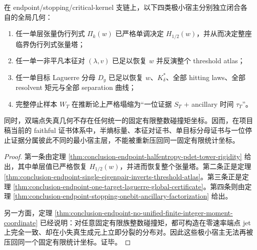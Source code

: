 \begin{theorem}\label{thm:conclusion-endpoint-four-minimal-hosts-noncompressible}
在 endpoint/stopping/critical-kernel 支链上，以下四类极小宿主分别独立闭合各自的全局几何：
\begin{enumerate}
  \item 任一单层张量伪行列式 \(\Pi_k(w)\) 已严格单调决定 \(H_{1/2}(w)\)，并从而决定整座临界伪行列式张量塔；
  \item 任一单一非平凡本征对 \((\lambda,v)\) 已足以恢复 \(w\) 并反演整个 threshold atlas；
  \item 任一单目标 Laguerre 分母 \(D_y\) 已足以恢复 \(w\)、\(K_\delta^\ast\)、全部 hitting laws、全部 resolvent 矩元与全部 separation 曲线；
  \item 完整停止样本 \(W_T\) 在推断论上严格塌缩为“一位证据 \(S_T\) \(+\) ancillary 时间 \(\tau_T\)”。
\end{enumerate}
同时，双端点失真几何不存在任何统一的固定有限整数碰撞矩坐标。因而，在项目稿当前的 faithful 证书体系中，半熵标量、本征对证书、单目标分母证书与一位停止证据分属彼此不同的最小宿主层，不能被重新压回同一固定有限统计坐标。
\end{theorem}
\begin{proof}
第一条由定理 \ref{thm:conclusion-endpoint-halfentropy-pdet-tower-rigidity} 给出，其中单层值已严格恢复 \(H_{1/2}(w)\)，并进而恢复整个张量塔。第二条正是定理 \ref{thm:conclusion-endpoint-single-eigenpair-inverts-threshold-atlas}。第三条正是定理 \ref{thm:conclusion-endpoint-one-target-laguerre-global-certificate}。第四条则由定理 \ref{thm:conclusion-endpoint-stopping-onebit-ancillary-factorization} 给出。

另一方面，定理 \ref{thm:conclusion-endpoint-no-unified-finite-integer-moment-coordinate} 已经说明：对任意固定有限族整数碰撞矩，都可构造在零速率端点 jet 上完全一致、却在小失真生成元上立即分裂的分布对。因此这些极小宿主无法再被压回同一个固定有限统计坐标。证毕。
\end{proof}

